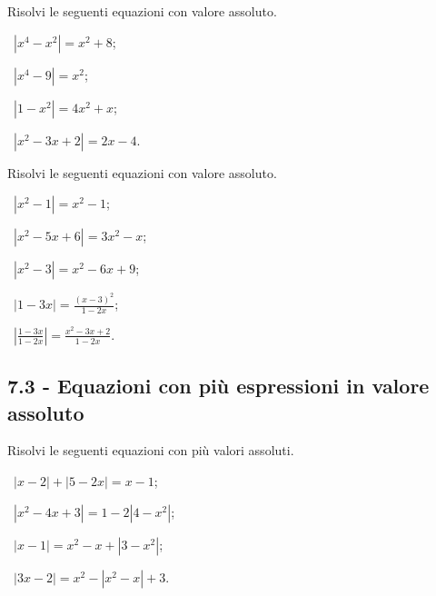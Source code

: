\begin{esercizio}[\Ast]
 \label{ese:7.14}
Risolvi le seguenti equazioni con valore assoluto.
\begin{multicols}{2}
 \begin{enumeratea}
 \item~$\left|x^4-x^2\right|=x^2+8$;
 \item~$\left|x^4-9\right|=x^2$;
 \item~$\left|1-x^2\right|=4x^2+x$;
 \item~$\left|x^2-3x+2\right|=2x-4$.
 \end{enumeratea}
 \end{multicols}
\end{esercizio}

\begin{esercizio}[\Ast]
 \label{ese:7.15}
Risolvi le seguenti equazioni con valore assoluto.
\begin{multicols}{2}
 \begin{enumeratea}
 \item~$\left|x^2-1\right|=x^2-1$;
 \item~$\left|x^2-5x+6\right|=3x^2-x$;
 \item~$\left|x^2-3\right|=x^2-6x+9$;
 \item~$\left|1-3x\right|=\frac{(x-3)^2}{1-2x}$;
 \item~$\left|\frac{1-3x}{1-2x}\right|=\frac{x^2-3x+2}{1-2x}$.
 \end{enumeratea}
 \end{multicols}
\end{esercizio}
\newpage
\subsection*{7.3 - Equazioni con più espressioni in valore assoluto}

\begin{esercizio}[\Ast]
 \label{ese:7.16}
Risolvi le seguenti equazioni con più valori assoluti.
\begin{multicols}{2}
 \begin{enumeratea}
 \item~$\left|x-2\right|+\left|5-2x\right|=x-1$;
 \item~$\left|x^2-4x+3\right|=1-2\left|4-x^2\right|$;
 \item~$\left|x-1\right|=x^2-x+\left|3-x^2\right|$;
 \item~$\left|3x-2\right|=x^2-\left|x^2-x\right|+3$.
 \end{enumeratea}
 \end{multicols}
\end{esercizio}

